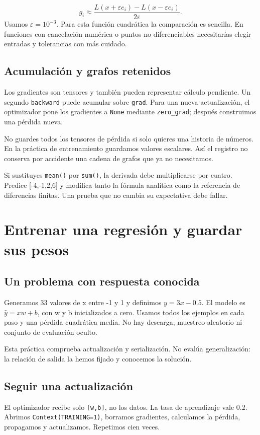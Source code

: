 \documentclass[12pt,a4paper,oneside]{report}
\begin{document}
\[
g_i\approx\frac{L(x+\varepsilon e_i)-L(x-\varepsilon e_i)}{2\varepsilon}.
\]
Usamos $\varepsilon=10^{-3}$. Para esta función cuadrática la comparación es sencilla. En funciones con cancelación numérica o puntos no diferenciables necesitarías elegir entradas y tolerancias con más cuidado.

\section{Acumulación y grafos retenidos}
Los gradientes son tensores y también pueden representar cálculo pendiente. Un segundo \texttt{backward} puede acumular sobre \texttt{grad}. Para una nueva actualización, el optimizador pone los gradientes a \texttt{None} mediante \texttt{zero\_grad}; después construimos una pérdida nueva.

No guardes todos los tensores de pérdida si solo quieres una historia de números. En la práctica de entrenamiento guardamos valores escalares. Así el registro no conserva por accidente una cadena de grafos que ya no necesitamos.

\begin{comprueba}
Si sustituyes \texttt{mean()} por \texttt{sum()}, la derivada debe multiplicarse por cuatro. Predice [-4,-1,2,6] y modifica tanto la fórmula analítica como la referencia de diferencias finitas. Una prueba que no cambia su expectativa debe fallar.

\end{comprueba}
\chapter{Entrenar una regresión y guardar sus pesos}
\section{Un problema con respuesta conocida}
Generamos 33 valores de x entre -1 y 1 y definimos $y=3x-0.5$. El modelo es $\hat y=xw+b$, con w y b inicializados a cero. Usamos todos los ejemplos en cada paso y una pérdida cuadrática media. No hay descarga, muestreo aleatorio ni conjunto de evaluación oculto.

Esta práctica comprueba actualización y serialización. No evalúa generalización: la relación de salida la hemos fijado y conocemos la solución.

\section{Seguir una actualización}
El optimizador recibe solo \texttt{[w,b]}, no los datos. La tasa de aprendizaje vale 0.2. Abrimos \texttt{Context(TRAINING=1)}, borramos gradientes, calculamos la pérdida, propagamos y actualizamos. Repetimos cien veces.
\end{document}
